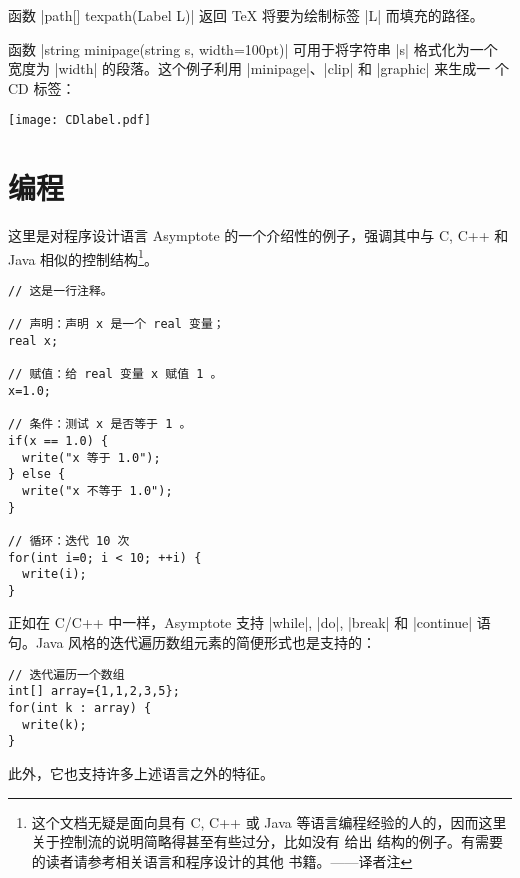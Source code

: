 \documentclass[nofonts,CJKnormalspaces]{ctexbook}[2009/05/20]
\newcommand*\prgname[1]{\textsf{#1}}
\newcommand\transnote[1]{\footnote{#1——译者注}}
\begin{document}
函数 |path[] texpath(Label L)| 返回 \TeX{} 将要为绘制标签 |L| 而填充的路径。

函数 |string minipage(string s, width=100pt)| 可用于将字符串 |s| 格式化为一个
宽度为 |width| 的段落。这个例子利用 |minipage|、|clip| 和 |graphic| 来生成一
个 CD 标签：
\begin{center}
  \texttt{[image: CDlabel.pdf]}
\end{center}



\chapter{编程}
\label{chap:programming}

这里是对程序设计语言 \prgname{Asymptote} 的一个介绍性的例子，强调其中与
C, C++ 和 Java 相似的控制结构\transnote{这个文档无疑是面向具有 C, C++ 或 Java
等语言编程经验的人的，因而这里关于控制流的说明简略得甚至有些过分，比如没有
给出 \inlinecode{do} 结构的例子。有需要的读者请参考相关语言和程序设计的其他
书籍。}。

\begin{lstlisting}
// 这是一行注释。

// 声明：声明 x 是一个 real 变量；
real x;

// 赋值：给 real 变量 x 赋值 1 。
x=1.0;

// 条件：测试 x 是否等于 1 。
if(x == 1.0) {
  write("x 等于 1.0");
} else {
  write("x 不等于 1.0");
}

// 循环：迭代 10 次
for(int i=0; i < 10; ++i) {
  write(i);
}
\end{lstlisting}

正如在 C/C++ 中一样，\prgname{Asymptote} 支持 |while|, |do|, |break| 和
|continue| 语句。Java 风格的迭代遍历数组元素的简便形式也是支持的：
\begin{lstlisting}
// 迭代遍历一个数组
int[] array={1,1,2,3,5};
for(int k : array) {
  write(k);
}
\end{lstlisting}
此外，它也支持许多上述语言之外的特征。
\end{document}
